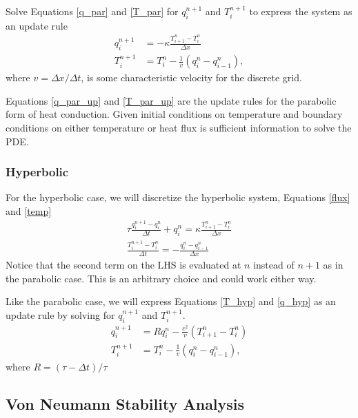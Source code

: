 \documentclass[iop]{emulateapj}
\begin{document}
				Solve Equations \ref{q_par} and \ref{T_par} for $q_i^{n+1}$ and $T_i^{n+1}$ to express the system as an update rule
				\begin{align}
						q_i^{n+1} &= - \kappa \frac{T_{i+1}^n - T_i^n}{\Delta x} \label{q_par_up}\\
						T_i^{n+1} &= T_i^n - \frac{1}{v} \left( q_i^n - q_{i-1}^n \right), \label{T_par_up}
				\end{align}
				where $v = \Delta x / \Delta t$, is some characteristic velocity for the discrete grid.
				
				Equations \ref{q_par_up} and \ref{T_par_up} are the update rules for the parabolic form of heat conduction. 
					Given initial conditions on temperature and boundary conditions on either temperature or heat flux is sufficient information to solve the \ac{PDE}.
					
			\subsubsection{Hyperbolic}
			
				For the hyperbolic case, we will discretize the hyperbolic system, Equations \ref{flux} and \ref{temp}
				\begin{gather}
					\tau \frac{q_i^{n+1} - q_i^n}{\Delta t} + q_i^n =  \kappa \frac{T_{i+1}^n - T_i^n}{\Delta x} \label{q_hyp} \\
					\frac{T_i^{n+1} - T_i^n}{\Delta t} = - \frac{q_i^n - q_{i-1}^n}{\Delta x} \label{T_hyp}
				\end{gather}
				Notice that the second term on the \ac{LHS} is evaluated at $n$ instead of $n+1$ as in the parabolic case.
					This is an arbitrary choice and could work either way.
					
				Like the parabolic case, we will express Equations \ref{T_hyp} and \ref{q_hyp} as an update rule by solving for $q_i^{n+1}$ and $T_i^{n+1}$.
				\begin{align}
					q_i^{n+1} &= R q_i^n - \frac{c^2}{v} \left( T_{i+1}^n - T_i^n \right) \\
					T_i^{n+1} &= T_i^n - \frac{1}{v} \left( q_i^n - q_{i-1}^n \right),
				\end{align}
				where $R = (\tau - \Delta t) / \tau$
			
		\subsection{Von Neumann Stability Analysis} \label{vnsa_sec}
		
\end{document}

